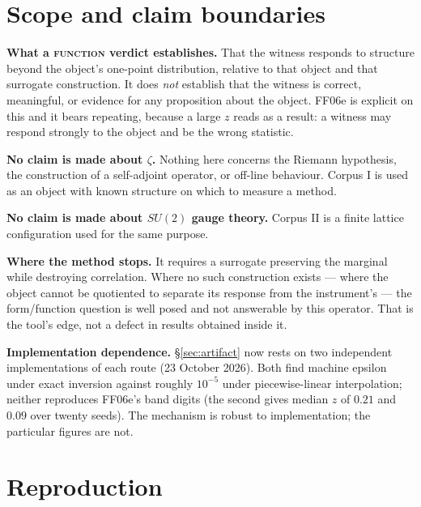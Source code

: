 \documentclass[11pt]{article}
\theoremstyle{remark}
\newcommand{\tier}[1]{\textsc{#1}}
\begin{document}
\section{Scope and claim boundaries}\label{sec:scope}

\textbf{What a \tier{function} verdict establishes.} That the witness responds to
structure beyond the object's one-point distribution, relative to that object and that
surrogate construction. It does \emph{not} establish that the witness is correct,
meaningful, or evidence for any proposition about the object. FF06e is explicit on this
and it bears repeating, because a large $z$ reads as a result: a witness may respond
strongly to the object and be the wrong statistic.

\textbf{No claim is made about $\zeta$.} Nothing here concerns the Riemann hypothesis, the
construction of a self-adjoint operator, or off-line behaviour. Corpus I is used as an
object with known structure on which to measure a method.

\textbf{No claim is made about $SU(2)$ gauge theory.} Corpus II is a finite lattice
configuration used for the same purpose.

\textbf{Where the method stops.} It requires a surrogate preserving the marginal while
destroying correlation. Where no such construction exists --- where the object cannot be
quotiented to separate its response from the instrument's --- the form/function question
is well posed and not answerable by this operator. That is the tool's edge, not a defect
in results obtained inside it.

\textbf{Implementation dependence.} \S\ref{sec:artifact} now rests on two independent
implementations of each route (23 October 2026). Both find machine epsilon under exact
inversion against roughly $10^{-5}$ under piecewise-linear interpolation; neither
reproduces FF06e's band digits (the second gives median $z$ of $0.21$ and $0.09$ over
twenty seeds). The mechanism is robust to implementation; the particular figures are not.

\section{Reproduction}\label{sec:repro}
\end{document}
